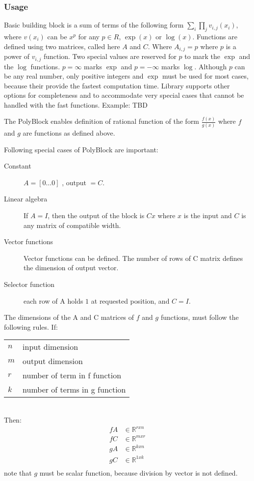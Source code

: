 \documentclass {article}
\newcommand{\field}[1]{\mathbb{#1}}
\newcommand{\reals}{\field{R}}
\begin{document}
\subsubsection{Usage}

Basic building block is a sum of terms of the following form $\sum_i \prod_j
v_{i,j}(x_i)$, where $v(x_i)$ can be $x^p$ for any $p \in R$, $\exp(x)$ or
$\log(x)$. 
Functions are defined using two matrices, called here $A$ and $C$.  Where
$A_{i,j} = p$ where $p$ is a power of $v_{i,j}$ function.  
Two special values are reserved for $p$ to mark the $\exp$ and the $\log$
functions. $p = \infty $ marks $\exp$ and $p =-\infty$ marks $\log$.
Although $p$ can be any real number, only positive integers and $\exp$ must be
used for most cases, because their provide the fastest computation time. 
Library supports other options for completeness and to accommodate very
special cases that cannot be handled with the fast functions. 
Example:
TBD
  
The PolyBlock enables definition of rational function of the form $\frac{f(x)}{g(x)}$ where $f$ and $g$ are functions as defined above.

Following special cases of PolyBlock are important:
\begin{description}
  \item [Constant] $A = [0 \ldots 0]$ , output $= C$.
\item [Linear algebra] If $A=I$, then the output of the block is $Cx$ where
  $x$ is the input and $C$ is any matrix of compatible width. 
\item [Vector functions] Vector functions can be defined. The number of rows
  of C matrix defines the dimension of output vector.
 
\item [Selector function] each row of A holds $1$ at requested position, and
  $C=I$. 
\end{description}

The dimensions of the A and C matrices of $f$ and $g$ functions, must follow
the following rules. If:\\
\begin{tabular}{ll}
$n$ &input dimension
 \\
$m$ & output dimension
 \\
$r$ & number of term in f function \\
$k$ & number of terms in g function
 \\
\end{tabular} \\
Then: \\
\begin{align*}
fA &\in \reals^{r x n} \\
fC &\in \reals^{m x r}
 \\
gA &\in \reals^{k x n}
 \\
gC &\in \reals^{1 x k}
 \\
\end{align*}
note that $g$ must be scalar function, because division by vector is not defined.
\end{document}
